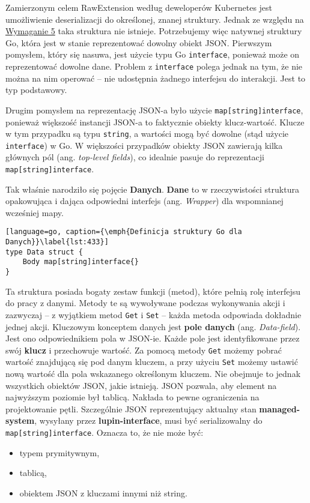 Zamierzonym celem RawExtension według deweloperów Kubernetes jest umożliwienie deserializacji do określonej, znanej struktury. Jednak ze względu na \hyperref[req:5]{Wymaganie 5} taka struktura nie istnieje. Potrzebujemy więc natywnej struktury Go, która jest w stanie reprezentować dowolny obiekt JSON. Pierwszym pomysłem, który się nasuwa, jest użycie typu Go \texttt{interface{}}, ponieważ może on reprezentować dowolne dane. Problem z \texttt{interface{}} polega jednak na tym, że nie można na nim operować – nie udostępnia żadnego interfejsu do interakcji. Jest to typ podstawowy.

Drugim pomysłem na reprezentację JSON-a było użycie \texttt{map[string]interface{}}, ponieważ większość instancji JSON-a to faktycznie obiekty klucz-wartość. Klucze w tym przypadku są typu \texttt{string}, a wartości mogą być dowolne (stąd użycie \texttt{interface{}}) w Go. W większości przypadków obiekty JSON zawierają kilka głównych pól (ang. \textit{top-level fields}), co idealnie pasuje do reprezentacji \texttt{map[string]interface{}}.

Tak właśnie narodziło się pojęcie \textbf{Danych}. \textbf{Dane} to w rzeczywistości struktura opakowująca i dająca odpowiedni interfejs (ang. \textit{Wrapper}) dla wspomnianej wcześniej mapy.

\begin{lstlisting}[language=go, caption={\emph{Definicja struktury Go dla Danych}}\label{lst:433}]
type Data struct {
	Body map[string]interface{}
}
\end{lstlisting}

Ta struktura posiada bogaty zestaw funkcji (metod), które pełnią rolę interfejsu do pracy z danymi. Metody te są wywoływane podczas wykonywania akcji i zazwyczaj – z wyjątkiem metod \texttt{Get} i \texttt{Set} – każda metoda odpowiada dokładnie jednej akcji. Kluczowym konceptem danych jest \textbf{pole danych} (ang. \textit{Data-field}). Jest ono odpowiednikiem pola w JSON-ie. Każde pole jest identyfikowane przez swój \textbf{klucz} i przechowuje wartość. Za pomocą metody \texttt{Get} możemy pobrać wartość znajdującą się pod danym kluczem, a przy użyciu \texttt{Set} możemy ustawić nową wartość dla pola wskazanego określonym kluczem. Nie obejmuje to jednak wszystkich obiektów JSON, jakie istnieją. JSON pozwala, aby element na najwyższym poziomie był tablicą. Nakłada to pewne ograniczenia na projektowanie pętli. Szczególnie JSON reprezentujący aktualny stan \textbf{managed-system}, wysyłany przez \textbf{lupin-interface}, musi być serializowalny do \texttt{map[string]interface{}}. Oznacza to, że nie może być:
\begin{itemize}
    \item typem prymitywnym,
    \item tablicą,
    \item obiektem JSON z kluczami innymi niż string.
\end{itemize}

